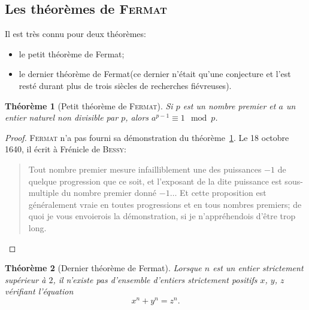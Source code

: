 \documentclass[a4paper,11pt]{article}
\theoremstyle{plain}
\newtheorem{thm}{Théorème}[section]
\theoremstyle{definition}
\theoremstyle{remark}
\newcommand{\nom}[1]{\textsc{#1}\xspace}
\newcommand{\fermat}{\nom{Fermat}}
\begin{document}
\subsection{Les \flqq théorèmes de \fermat\frqq}
Il est très connu pour deux \flqq théorèmes\frqq:
\begin{itemize}
\item le \flqq petit théorème de Fermat\frqq;
\item le \flqq dernier théorème de Fermat\frqq (ce dernier n'était qu'une conjecture et l'est resté durant plus de trois siècles de recherches fiévreuses).
\end{itemize}



\begin{thm}[Petit théorème de \textsc{Fermat}]\label{theoreme.I}
Si $p$ est un nombre premier et $a$ un entier naturel non divisible par $p$, alors $a^{p-1}\equiv 1 \mod p$. 
\end{thm}
\begin{proof}
\fermat n'a pas fourni sa démonstration du théorème~\ref{theoreme.I}. Le 18 octobre 1640, il écrit à Frénicle de \textsc{Bessy}:
\begin{quotation}
\flqq Tout nombre premier mesure infailliblement une des puissances $-1$ de quelque progression que ce soit, et l'exposant de la dite puissance est sous-multiple du nombre premier donné $-1\dots$ Et cette proposition est généralement vraie en toutes progressions et en tous nombres premiers; de quoi je vous envoierois la démonstration, si je n'appréhendois d'être trop long.\frqq
\end{quotation}
\end{proof}


\begin{thm}[Dernier théorème de Fermat]
Lorsque $n$ est un entier strictement supérieur à $2$, il n'existe pas d'ensemble d'entiers strictement positifs $x$, $y$, $z$ vérifiant l'équation 
\[
x^n + y^n = z^n.
\]
\end{thm}
\end{document}

